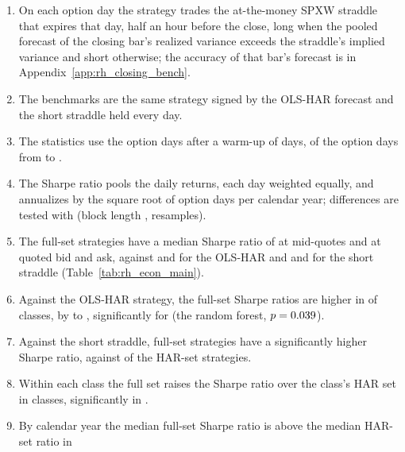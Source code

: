\begin{enumerate}
\item On each option day the strategy trades the at-the-money SPXW straddle that expires that day, half an hour before
  the close, long when the pooled forecast of the closing bar's realized variance exceeds the straddle's implied
  variance and short otherwise; the accuracy of that bar's forecast is in Appendix~\ref{app:rh_closing_bench}.
\item The benchmarks are the same strategy signed by the OLS-HAR forecast and the short straddle held every day.
\item The statistics use the \rheSzDays{} option days after a warm-up of \rheSzWarmup{} days, of the \rheNdays{} option
  days from \rheSampleStart{} to \rheSampleEnd.
\item The Sharpe ratio pools the daily returns, each day weighted equally, and annualizes by the square root of
  \rheAnnDays{} option days per calendar year; differences are tested with \citet{LedoitWolf2008} (block length
  \rheLWBlock, \rheLWBoot{} resamples).
\item The full-set strategies have a median Sharpe ratio of \rhemFullShMed{} at mid-quotes and \rhemFullShXMed{} at
  quoted bid and ask, against \rhemShOlsHar{} and \rhemShXOlsHar{} for the OLS-HAR and \rhemShShort{} and \rhemShXShort{}
  for the short straddle (Table~\ref{tab:rh_econ_main}).
\item Against the OLS-HAR strategy, the full-set Sharpe ratios are higher in \rhemFullVsOlsPos{} of \rhmcsNAlt{}
  classes, by \rhemFullVsOlsMin{} to \rhemFullVsOlsMax, significantly for \rhemFullVsOlsSigWord{} (the random forest,
  $p = 0.039$).
\item Against the short straddle, \rhemFullVsShortSigWord{} full-set strategies have a significantly higher Sharpe
  ratio, against \rhemHarVsShortSigWord{} of the HAR-set strategies.
\item Within each class the full set raises the Sharpe ratio over the class's HAR set in \rhemFullVsHarPosWord{}
  classes, significantly in \rhemFullVsHarSigWord.
\item By calendar year the median full-set Sharpe ratio is above the median HAR-set ratio in

\end{enumerate}
